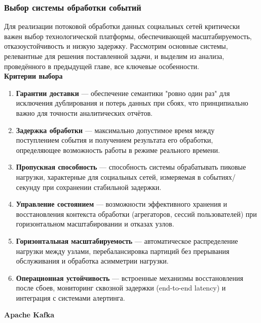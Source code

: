         \subsubsection{Выбор системы обработки событий}
            Для реализации потоковой обработки данных социальных сетей критически важен выбор технологической платформы, обеспечивающей масштабируемость, отказоустойчивость и низкую задержку. Рассмотрим основные системы, релевантные для решения поставленной задачи, и выделим из анализа, проведённого в предыдущей главе, все ключевые особенности. \\

            \textbf{Критерии выбора}
            \begin{enumerate}
                \item \textbf{Гарантии доставки} — обеспечение семантики "ровно один раз" для исключения дублирования и потерь данных при сбоях, что принципиально важно для точности аналитических отчётов.
                \item \textbf{Задержка обработки} — максимально допустимое время между поступлением события и получением результата его обработки, определяющее возможность работы в режиме реального времени.
                \item \textbf{Пропускная способность} — способность системы обрабатывать пиковые нагрузки, характерные для социальных сетей, измеряемая в событиях/секунду при сохранении стабильной задержки.
                \item \textbf{Управление состоянием} — возможности эффективного хранения и восстановления контекста обработки (агрегаторов, сессий пользователей) при горизонтальном масштабировании и отказах узлов.
                \item \textbf{Горизонтальная масштабируемость} — автоматическое распределение нагрузки между узлами, перебалансировка партиций без прерывания обслуживания и обработка асимметрии нагрузки.
                \item \textbf{Операционная устойчивость} — встроенные механизмы восстановления после сбоев, мониторинг сквозной задержки (end-to-end latency) и интеграция с системами алертинга.
            \end{enumerate}

            \textbf{Apache Kafka}

